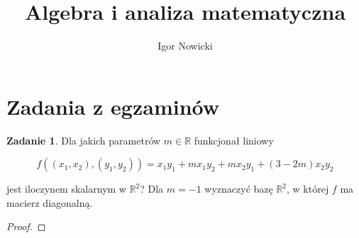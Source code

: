 \documentclass[11pt]{article}
\title{Algebra i analiza matematyczna}
\author{Igor Nowicki}
\theoremstyle{definition}
\newtheorem{zadanie}{Zadanie}
\numberwithin{zadanie}{section}
\begin{document}
\maketitle
\tableofcontents

\section{Zadania z egzaminów}

\begin{zadanie}
Dla jakich parametrów $m\in\mathbb R$ funkcjonał liniowy

$$f((x_1,x_2), (y_1,y_2)) = x_1y_1+mx_1y_2+mx_2y_1+(3-2m)x_2y_2$$

jest iloczynem skalarnym w $\mathbb R^2$? Dla $m=-1$ wyznaczyć bazę $\mathbb R^2$, w której $f$ ma macierz diagonalną.
\end{zadanie}
\begin{proof}

\end{proof}
\end{document}
